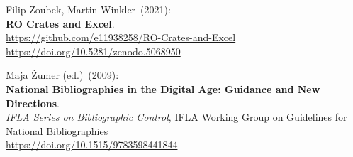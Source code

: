 \begin{thebibliography}{9}
Filip Zoubek, Martin Winkler~(2021): \\
\textbf{RO Crates and Excel}.\\
\url{https://github.com/e11938258/RO-Crates-and-Excel}\\
\url{https://doi.org/10.5281/zenodo.5068950}

Maja Žumer (ed.)~(2009): \\
\textbf{National Bibliographies in the Digital Age: Guidance and New
Directions}.\\
\emph{IFLA Series on Bibliographic Control}, IFLA Working Group on
Guidelines for National Bibliographies\\
\url{https://doi.org/10.1515/9783598441844}

\end{thebibliography}

\makeatother

